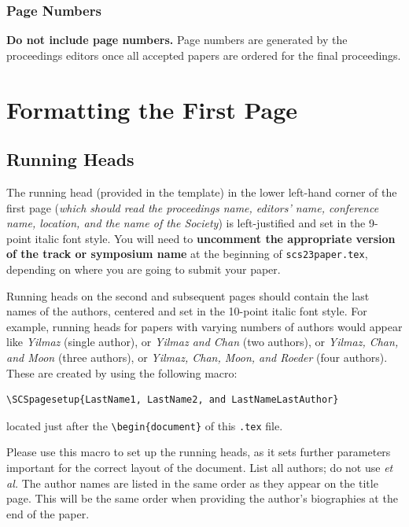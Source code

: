 \documentclass{scspaperproc}
\theoremstyle{scsthe}
\begin{document}
\subsubsection{Page Numbers}
\textbf{Do not include page numbers.} Page numbers are generated by the proceedings editors once all accepted papers are ordered for the final proceedings.


\section{Formatting the First Page}

\subsection{Running Heads}
The running head (provided in the template) in the lower left-hand corner of the first page (\textit{which should read the proceedings name, editors' name, conference name, location, and the name of the Society}) is left-justified and set in the 9-point italic font style. %
You will need to \textbf{uncomment the appropriate version of the track or symposium name} at the beginning of \texttt{scs23paper.tex}, depending on where you are going to submit your paper.

Running heads on the second and subsequent pages should contain the last names of the authors, centered and set in the 10-point italic font style. For example, running heads for papers with varying numbers of authors would appear like \emph{Yilmaz} (single author), or \emph{Yilmaz and Chan} (two authors), or \emph{Yilmaz, Chan, and Moon} (three authors), or \emph{Yilmaz, Chan, Moon, and Roeder} (four authors). These are created by using the following macro:

\noindent \begin{verbatim}
\SCSpagesetup{LastName1, LastName2, and LastNameLastAuthor}
\end{verbatim}

located just after the \verb+\begin{document}+ of this \texttt{.tex} file.

Please use this macro to set up the running heads, as it sets further parameters important for the correct layout of the document. List all authors; do not use \textit{et al.} The author names are listed in the same order as they appear on the title page. This will be the same order when providing the author's biographies at the end of the paper.
\end{document}

